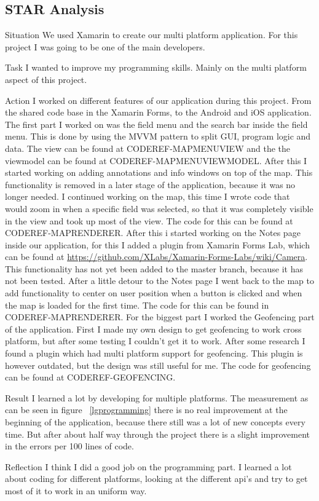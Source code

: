 \documentclass[12pt]{article}
\begin{document}
	\subsection{STAR Analysis}
	\begin{STAR}
	    \item[Situation] We used Xamarin to create our multi platform application. For this project I was going to be one of the main developers. 
	    \item[Task] I wanted to improve my programming skills. Mainly on the multi platform aspect of this project. 
	    \item[Action] I worked on different features of our application during this project. From the shared code base in the Xamarin Forms, to the Android and iOS application. The first part I worked on was the field menu and the search bar inside the field menu. This is done by using the MVVM pattern to split GUI, program logic and data. The view can be found at CODEREF-MAPMENUVIEW and the the viewmodel can be found at CODEREF-MAPMENUVIEWMODEL. After this I started working on adding annotations and info windows on top of the map. This functionality is removed in a later stage of the application, because it was no longer needed. I continued working on the map, this time I wrote code that would zoom in when a specific field was selected, so that it was completely visible in the view and took up most of the view. The code for this can be found at CODEREF-MAPRENDERER. After this i started working on the Notes page inside our application, for this I added a plugin from Xamarin Forms Lab, which can be found at \url{https://github.com/XLabs/Xamarin-Forms-Labs/wiki/Camera}. This functionality has not yet been added to the master branch, because it has not been tested. After a little detour to the Notes page I went back to the map to add functionality to center on user position when a button is clicked and when the map is loaded for the first time. The code for this can be found in CODEREF-MAPRENDERER. For the biggest part I worked the Geofencing part of the application. First I made my own design to get geofencing to work cross platform, but after some testing I couldn't get it to work. After some research I found a plugin which had multi platform support for geofencing. This plugin is however outdated, but the design was still useful for me. The code for geofencing can be found at CODEREF-GEOFENCING.
	    \item[Result] I learned a lot by developing for multiple platforms. The measurement as can be seen in figure ~\ref{lgprogramming} there is no real improvement at the beginning of the application, because there still was a lot of new concepts every time. But after about half way through the project there is a slight improvement in the errors per 100 lines of code.
	    \item[Reflection] I think I did a good job on the programming part. I learned a lot about coding for different platforms, looking at the different api's and try to get most of it to work in an uniform way.
	\end{STAR}
	
\end{document}
